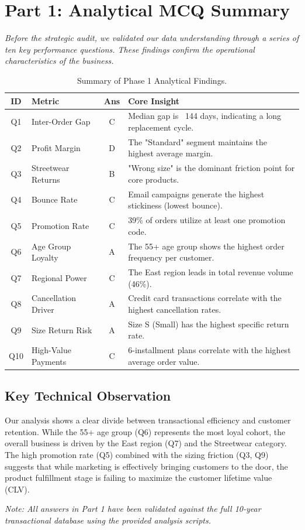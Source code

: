 \section{Part 1: Analytical MCQ Summary}
\textit{Before the strategic audit, we validated our data understanding through a series of ten key performance questions. These findings confirm the operational characteristics of the business.}

\begin{table}[h]
\centering
\small
\begin{tabular}{cp{}cp{}}
\toprule
\textbf{ID} & \textbf{Metric} & \textbf{Ans} & \textbf{Core Insight} \\
\midrule
Q1 & Inter-Order Gap & C & Median gap is ~144 days, indicating a long replacement cycle. \\
Q2 & Profit Margin & D & The "Standard" segment maintains the highest average margin. \\
Q3 & Streetwear Returns & B & "Wrong size" is the dominant friction point for core products. \\
Q4 & Bounce Rate & C & Email campaigns generate the highest stickiness (lowest bounce). \\
Q5 & Promotion Rate & C & 39\% of orders utilize at least one promotion code. \\
Q6 & Age Group Loyalty & A & The 55+ age group shows the highest order frequency per customer. \\
Q7 & Regional Power & C & The East region leads in total revenue volume (46\%). \\
Q8 & Cancellation Driver & A & Credit card transactions correlate with the highest cancellation rates. \\
Q9 & Size Return Risk & A & Size S (Small) has the highest specific return rate. \\
Q10 & High-Value Payments & C & 6-installment plans correlate with the highest average order value. \\
\bottomrule
\end{tabular}
\caption{Summary of Phase 1 Analytical Findings.}
\end{table}

\subsection{Key Technical Observation}
Our analysis shows a clear divide between transactional efficiency and customer retention. While the 55+ age group (Q6) represents the most loyal cohort, the overall business is driven by the East region (Q7) and the Streetwear category. The high promotion rate (Q5) combined with the sizing friction (Q3, Q9) suggests that while marketing is effectively bringing customers to the door, the product fulfillment stage is failing to maximize the customer lifetime value (CLV).

\textit{Note: All answers in Part 1 have been validated against the full 10-year transactional database using the provided analysis scripts.}
